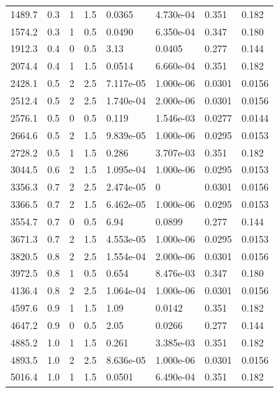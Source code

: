 \documentclass[preview]{standalone}
\begin{document}
{{\begin{tabular}{L{1.2cm}C{1.2cm} C{0.3cm}C{0.5cm} C{1.4cm}C{1.4cm} C{1.4cm}C{1.4cm}}
  1489.7  &   0.3  & 1     & 1.5 &  0.0365  & 4.730e-04  & 0.351 &  0.182   \\ 
  1574.2  &   0.3  & 1     & 0.5 &  0.0490  & 6.350e-04  & 0.347 &  0.180   \\ 
  1912.3  &   0.4  & 0     & 0.5 &  3.13  & 0.0405  & 0.277 &  0.144   \\ 
  2074.4  &   0.4  & 1     & 1.5 &  0.0514  & 6.660e-04  & 0.351 &  0.182   \\ 
  2428.1  &   0.5  & 2     & 2.5 &  7.117e-05  & 1.000e-06  & 0.0301 &  0.0156   \\ 
  2512.4  &   0.5  & 2     & 2.5 &  1.740e-04  & 2.000e-06  & 0.0301 &  0.0156   \\ 
  2576.1  &   0.5  & 0     & 0.5 &  0.119  & 1.546e-03  & 0.0277 &  0.0144   \\ 
  2664.6  &   0.5  & 2     & 1.5 &  9.839e-05  & 1.000e-06  & 0.0295 &  0.0153   \\ 
  2728.2  &   0.5  & 1     & 1.5 &  0.286  & 3.707e-03  & 0.351 &  0.182   \\ 
  3044.5  &   0.6  & 2     & 1.5 &  1.095e-04  & 1.000e-06  & 0.0295 &  0.0153   \\ 
  3356.3  &   0.7  & 2     & 2.5 &  2.474e-05  & 0  & 0.0301 &  0.0156   \\ 
  3366.5  &   0.7  & 2     & 1.5 &  6.462e-05  & 1.000e-06  & 0.0295 &  0.0153   \\ 
  3554.7  &   0.7  & 0     & 0.5 &  6.94  & 0.0899  & 0.277 &  0.144   \\ 
  3671.3  &   0.7  & 2     & 1.5 &  4.553e-05  & 1.000e-06  & 0.0295 &  0.0153   \\ 
  3820.5  &   0.8  & 2     & 2.5 &  1.554e-04  & 2.000e-06  & 0.0301 &  0.0156   \\ 
  3972.5  &   0.8  & 1     & 0.5 &  0.654  & 8.476e-03  & 0.347 &  0.180   \\ 
  4136.4  &   0.8  & 2     & 2.5 &  1.064e-04  & 1.000e-06  & 0.0301 &  0.0156   \\ 
  4597.6  &   0.9  & 1     & 1.5 &  1.09  & 0.0142  & 0.351 &  0.182   \\ 
  4647.2  &   0.9  & 0     & 0.5 &  2.05  & 0.0266  & 0.277 &  0.144   \\ 
  4885.2  &   1.0  & 1     & 1.5 &  0.261  & 3.385e-03  & 0.351 &  0.182   \\ 
  4893.5  &   1.0  & 2     & 2.5 &  8.636e-05  & 1.000e-06  & 0.0301 &  0.0156   \\ 
  5016.4  &   1.0  & 1     & 1.5 &  0.0501  & 6.490e-04  & 0.351 &  0.182   \\ 

\end{tabular}}}
\end{document}
